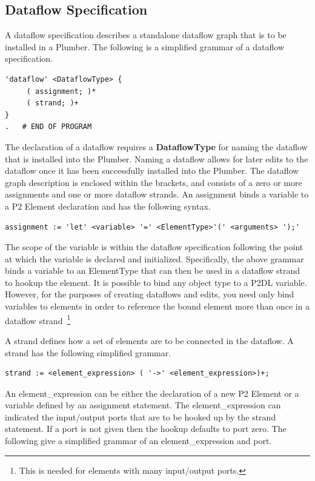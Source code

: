 \documentclass[12pt]{article}
\begin{document}
\subsection{Dataflow Specification}

A dataflow specification describes a standalone dataflow graph that is to be installed 
in a Plumber. The following is a simplified grammar of a dataflow specification.

\pagebreak

\begin{verbatim}
'dataflow' <DataflowType> {
     ( assignment; )*
     ( strand; )+
}
.	# END OF PROGRAM
\end{verbatim}

The declaration of a dataflow requires a {\bf DataflowType} for naming the dataflow that is
installed into the Plumber. Naming a dataflow allows for later edits to the dataflow once it
has been successfully installed into the Plumber. The dataflow graph description is enclosed within
the brackets, and consists of a zero or more assignments and one or more dataflow strands.
An assignment binds a variable to a P2 Element declaration and has the following syntax.

\begin{verbatim}
assignment := 'let' <variable> '=' <ElementType>'(' <arguments> ');'
\end{verbatim}

The scope of the variable is within the dataflow specification following the point at which
the variable is declared and initialized. Specifically, the above grammar binds a variable
to an ElementType that can then be used in a dataflow strand to hookup the element.
It is possible to bind any object type to a P2DL variable. However, for the purposes of creating
dataflows and edits, you need only bind variables to elements in order to reference the bound
element more than once in a dataflow strand~\footnote{This is needed for elements
with many input/output ports.}

A strand defines how a set of elements are to be connected in the dataflow. A strand
has the following simplified grammar. 

\begin{verbatim}
strand := <element_expression> ( '->' <element_expression>)+;
\end{verbatim}

An element\_expression can be either the declaration of a new P2 Element or a variable defined
by an assignment statement. The element\_expression can indicated the input/output ports that
are to be hooked up by the strand statement. If a port is not given then the hookup defaults to port zero.
The following give a simplified grammar of an element\_expression and port.
\end{document}
